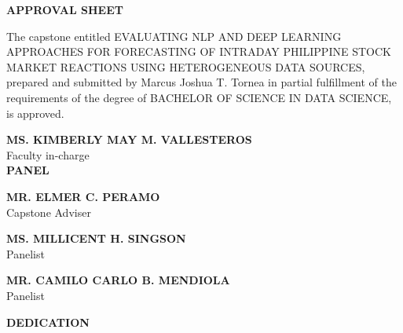 \documentclass[stu,floatsintext]{apa7}
\begin{document}
\newpage
{}
{}
\begin{center}
{\bfseries APPROVAL SHEET}
\end{center}
\vspace{0.3in}

The capstone entitled EVALUATING NLP AND DEEP LEARNING
APPROACHES FOR FORECASTING OF INTRADAY PHILIPPINE STOCK MARKET
REACTIONS USING HETEROGENEOUS DATA SOURCES, prepared and submitted
by Marcus Joshua T. Tornea in partial fulfillment of the requirements
of the degree of BACHELOR OF SCIENCE IN DATA SCIENCE, is approved.

\vspace{0.6in}
\begin{center}
{\bfseries MS. KIMBERLY MAY M. VALLESTEROS}\\
Faculty in-charge\\

\vspace{0.6in}
{\bfseries PANEL}

\vspace{0.6in}
{\bfseries MR. ELMER C. PERAMO} \\
Capstone Adviser

\vspace{0.6in}
{\bfseries MS. MILLICENT H. SINGSON}\\
Panelist

\vspace{0.6in}
{\bfseries MR. CAMILO CARLO B. MENDIOLA}\\
Panelist
\end{center}

\vfill

\newpage
{}
{}


\newpage
{}
{}


\newpage
{}
{}


\newpage
{}
{}
\begin{center}
{\bfseries DEDICATION}
\end{center}
\vspace{0.5in}
\end{document}
